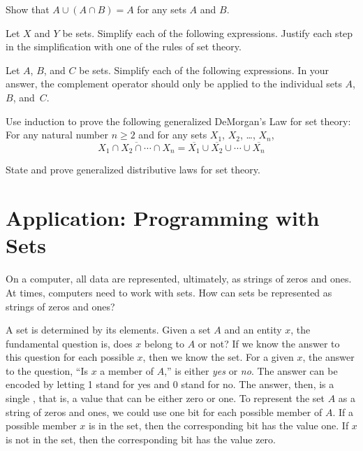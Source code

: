 \begin{exercises}
\problem Show that $A\cup (A\cap B)= A$ for any sets $A$ and $B$.

\problem Let $X$ and $Y$ be sets.  Simplify each of the
following expressions.  Justify each step in the simplification
with one of the rules of set theory.

\problem Let $A$, $B$, and $C$ be sets.  Simplify each of the following
expressions.  In your answer, the complement operator should only
be applied to the individual sets $A$, $B$, and~$C$.

\problem Use induction to prove the following generalized DeMorgan's Law
for set theory: 
For any natural number $n\geq 2$ and for any sets $X_1$, $X_2$, \dots, $X_n$,
\[\overline{X_1\cap X_2\cap \cdots \cap X_n} =
     \overline{X_1} \cup \overline{X_2} \cup\cdots\cup \overline{X_n}\]

\problem State and prove generalized distributive laws for set theory.


\end{exercises}


\section{Application: Programming with Sets}\label{S-sets-3}

On a computer, all data are represented, ultimately, as strings
of zeros and ones.  At times, computers need to work with
sets.  How can sets be represented as strings of zeros and ones?

A set is determined by its elements.  Given a set $A$ and an
entity $x$, the fundamental question is, does $x$ belong to $A$
or not?  If we know the answer to this question for each possible
$x$, then we know the set.  For a given $x$, the answer to the
question, ``Is $x$ a member of $A$,'' is either \textit{yes} or
\textit{no}.  The answer can be encoded by letting 1 stand for
yes and 0 stand for no.  The answer, then, is a single
, that is, a value that can be either zero or one.
To represent the set $A$ as a string of zeros and ones, 
we could use one bit for each possible member of $A$.
If a possible member $x$ is in the set, then the corresponding
bit has the value one.  If $x$ is not in the set, then the
corresponding bit has the value zero.

